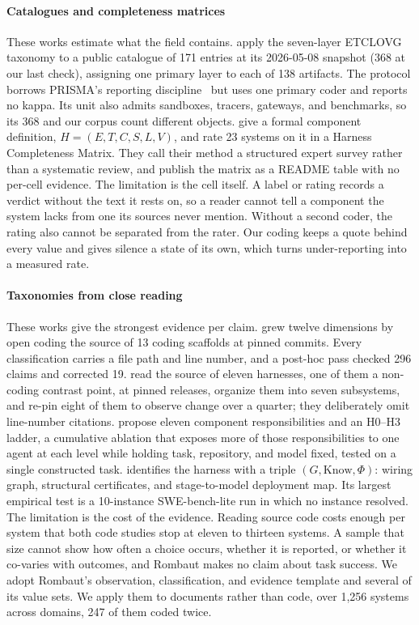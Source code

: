 \paragraph{Catalogues and completeness matrices}
These works estimate what the field contains. \citet{li2026harnessengineering} apply the seven-layer
ETCLOVG taxonomy to a public catalogue of 171 entries at its 2026-05-08 snapshot (368 at our last
check), assigning one primary layer to each of 138 artifacts. The protocol borrows PRISMA's reporting
discipline~\citep{page2021prisma} but uses one primary coder and reports no kappa. Its unit also admits
sandboxes, tracers, gateways, and benchmarks, so its 368 and our corpus count different objects.
\citet{meng2026harnesssurvey} give a formal component definition, $H=(E,T,C,S,L,V)$, and rate 23
systems on it in a Harness Completeness Matrix. They call their method a structured expert survey rather
than a systematic review, and publish the matrix as a README table with no per-cell evidence. The
limitation is the cell itself. A label or rating records a verdict without the text it rests on, so a
reader cannot tell a component the system lacks from one its sources never mention. Without a second
coder, the rating also cannot be separated from the rater. Our coding keeps a quote behind every value
and gives silence a state of its own, which turns under-reporting into a measured rate.

\paragraph{Taxonomies from close reading}
These works give the strongest evidence per claim. \citet{rombaut2026insidescaffold} grew twelve
dimensions by open coding the source of 13 coding scaffolds at pinned commits. Every classification
carries a file path and line number, and a post-hoc pass checked 296 claims and corrected 19.
\citet{barbaste2026anatomy} read the source of eleven harnesses, one of them a non-coding contrast
point, at pinned releases, organize them into seven subsystems, and re-pin eight of them to observe
change over a quarter; they deliberately omit line-number citations. \citet{zhong2026responsibilities}
propose eleven component responsibilities and an H0--H3 ladder, a cumulative ablation that exposes more
of those responsibilities to one agent at each level while holding task, repository, and model fixed,
tested on a single constructed task. \citet{harnesscategorical2026} identifies the harness with a triple
$(G,\mathrm{Know},\Phi)$: wiring graph, structural certificates, and stage-to-model deployment map. Its
largest empirical test is a 10-instance SWE-bench-lite run in which no instance resolved. The limitation
is the cost of the evidence. Reading source code costs enough per system that both code studies stop at
eleven to thirteen systems. A sample that size cannot show how often a choice occurs, whether it is reported, or
whether it co-varies with outcomes, and Rombaut makes no claim about task success. We adopt Rombaut's
observation, classification, and evidence template and several of its value sets. We apply them to
documents rather than code, over 1,256 systems across domains, 247 of them coded twice.

